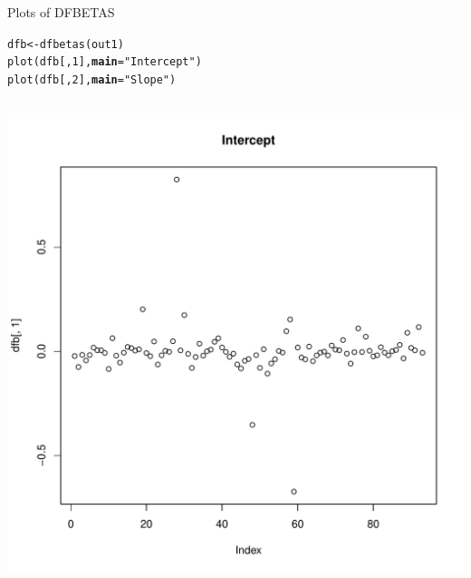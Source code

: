 \documentclass[10pt]{beamer}\usepackage[]{graphicx}\usepackage[]{color}
\makeatletter
\def\maxwidth{ %
  \ifdim\Gin@nat@width>\linewidth
    \linewidth
  \else
    \Gin@nat@width
  \fi
}
\newcommand{\hlnum}[1]{\textcolor[rgb]{0.69,0.494,0}{#1}}%
\newcommand{\hlstr}[1]{\textcolor[rgb]{0.749,0.012,0.012}{#1}}%
\newcommand{\hlstd}[1]{\textcolor[rgb]{0,0,0}{#1}}%
\newcommand{\hlkwb}[1]{\textcolor[rgb]{0,0.341,0.682}{#1}}%
\newcommand{\hlkwc}[1]{\textcolor[rgb]{0,0,0}{\textbf{#1}}}%
\newcommand{\hlkwd}[1]{\textcolor[rgb]{0.004,0.004,0.506}{#1}}%
\newenvironment{kframe}{%
 \def\at@end@of@kframe{}%
 \ifinner\ifhmode%
  \def\at@end@of@kframe{\end{minipage}}%
  \begin{minipage}{\columnwidth}%
 \fi\fi%
 \def\FrameCommand##1{\hskip\@totalleftmargin \hskip-\fboxsep
 \colorbox{shadecolor}{##1}\hskip-\fboxsep
     \hskip-\linewidth \hskip-\@totalleftmargin \hskip\columnwidth}%
 \MakeFramed {\advance\hsize-\width
   \@totalleftmargin\z@ \linewidth\hsize
   \@setminipage}}%
 {\par\unskip\endMakeFramed%
 \at@end@of@kframe}
\newenvironment{knitrout}{}{} %
\makeatother
\begin{document}

\begin{frame}[fragile]{Plots of DFBETAS}

\begin{knitrout}\footnotesize
{}\color{fgcolor}\begin{kframe}
\begin{alltt}
\hlstd{dfb} \hlkwb{<-} \hlkwd{dfbetas}\hlstd{(out1)}
\hlkwd{plot}\hlstd{(dfb[ ,} \hlnum{1}\hlstd{],} \hlkwc{main} \hlstd{=} \hlstr{"Intercept"}\hlstd{)}
\hlkwd{plot}\hlstd{(dfb[ ,} \hlnum{2}\hlstd{],} \hlkwc{main} \hlstd{=} \hlstr{"Slope"}\hlstd{)}
\end{alltt}
\end{kframe}
\end{knitrout}

  \begin{columns}
    \begin{column}{0.5\textwidth}

\begin{knitrout}\footnotesize
{}\color{fgcolor}

{\centering \includegraphics[width=\maxwidth]{figure/assumptions-unnamed-chunk-28-1} 

}
\end{knitrout}
\end{column}
\end{columns}
\end{frame}
\end{document}
